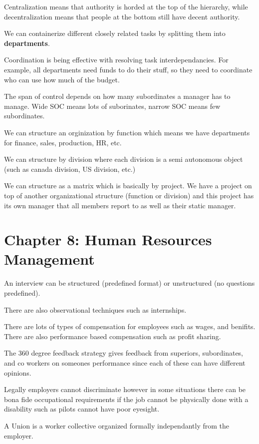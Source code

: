 \documentclass[12pt,letterpaper]{article} \usepackage{amsmath} \usepackage{graphicx} \usepackage[margin=1in]{geometry} \usepackage{longtable}  \usepackage{amssymb}
\begin{document}
		Centralization means that authority is horded at the top of the hierarchy, while decentralization means that people at the bottom still have decent authority.
		
		We can containerize different closely related tasks by splitting them into \textbf{departments}.
		
		Coordination is being effective with resolving task interdependancies. For example, all departments need funds to do their stuff, so they need to coordinate who can use how much of the budget. 
		
		The span of control depends on how many subordinates a manager has to manage. Wide SOC means lots of suborinates, narrow SOC means few subordinates. 
		
		We can structure an orginization by function which means we have departments for finance, sales, production, HR, etc.
		
		We can structure by division where each division is a semi autonomous object (such as canada division, US division, etc.)
		
		We can structure as a matrix which is basically by project. We have a project on top of another organizational structure (function or division) and this project has its own manager that all members report to as well as their static manager. 
		
		\section{Chapter 8: Human Resources Management}
		An interview can be structured (predefined format) or unstructured (no questions predefined).
		
		There are also observational techniques such as internships. 
		
		There are lots of types of compensation for employees such as wages, and benifits. There are also performance based compensation such as profit sharing. 
		
		The 360 degree feedback strategy gives feedback from superiors, subordinates, and co workers on someones performance since each of these can have different opinions. 
		
		Legally employers cannot discriminate however in some situations there can be bona fide occupational requirements if the job cannot be physically done with a disability such as pilots cannot have poor eyesight. 
		
		A Union is a worker collective organized formally independantly from the employer.
		
\end{document}
